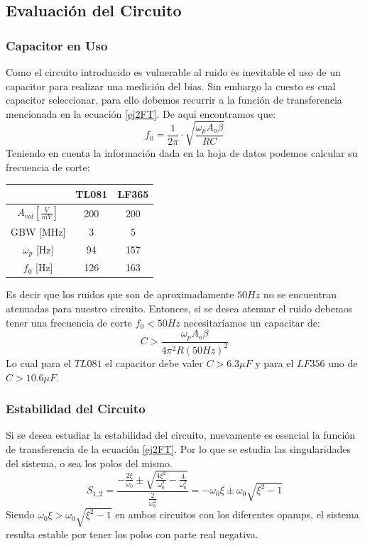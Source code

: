 \subsection{Evaluación del Circuito}

\subsubsection{Capacitor en Uso}

Como el circuito introducido es vulnerable al ruido es inevitable el uso de un capacitor para realizar una medición del bias. Sin embargo la cuesto es cual capacitor seleccionar, para ello debemos recurrir a la función de transferencia mencionada en la ecuación \ref{ej2FT}. De aqui encontramos que:
$$f_0=\frac{1}{2\pi}\cdot \sqrt{\frac{\omega_pA_o\beta}{RC}}$$
Teniendo en cuenta la información dada en la hoja de datos podemos calcular su frecuencia de corte:
\begin{table}[h]
\centering
\begin{tabular}{@{}ccc@{}}
\toprule
\textbf{}     & \textbf{TL081} & \textbf{LF365} \\ \midrule
$A_{vol} [\frac{V}{mV}]$          & 200            & 200            \\
GBW {[}MHz{]} & 3              & 5              \\
$\omega_p$ {[}Hz{]}   & 94             & 157            \\ \midrule
$f_0$ {[}Hz{]}    & 126            & 163           \\
\hline
\end{tabular}
\end{table}

\vspace{3cm}

Es decir que los ruidos que son de aproximadamente $50Hz$ no se encuentran atenuadas para nuestro circuito. Entonces, si se desea atenuar el ruido debemos tener una frecuencia de corte $f_0<50Hz$ necesitaríamos un capacitar de: 
$$C>\frac{\omega_pA_o\beta}{4\pi^2R(50Hz)^2}$$
Lo cual para el $TL081$ el capacitor debe valer $C > 6.3\mu F$ y para el $LF356$ uno de $C>10.6\mu F$.
 
\subsubsection{Estabilidad del Circuito}

Si se desea estudiar la estabilidad del circuito, nuevamente es esencial la función de transferencia de la ecuación \ref{ej2FT}. Por lo que se estudia las singularidades del sistema, o sea los polos del mismo.
$$S_{1,2} = \frac{-\frac{2\xi}{\omega_0}\pm\sqrt{\frac{4\xi^2}{\omega_0^2}-\frac{4}{\omega_0^2}}}{\frac{2}{\omega_0^2}}=-\omega_0\xi \pm {\omega_0}\sqrt{\xi^2-1}$$
Siendo $\omega_0\xi > {\omega_0}\sqrt{\xi^2-1}$ en ambos circuitos con los diferentes opamps, el sistema resulta estable por tener los polos con parte real negativa. 

